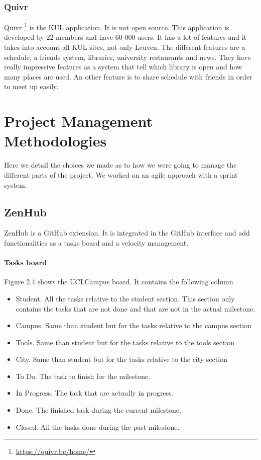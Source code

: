 \documentclass[11pt, a4paper]{report}
\begin{document}
\subsubsection{Quivr}
Quivr \footnote{\url{https://quivr.be/home/}} is the KUL application. It is not open source. This application is developed by 22 members and have 60 000 users. It has a lot of features and it takes into account all KUL sites, not only Leuven. The different features are a schedule, a friends system, libraries, university restaurants and news. They have really impressive features as a system that tell which library is open and how many places are used. An other feature is to share schedule with friends in order to meet up easily. 


\section{Project Management Methodologies}

Here we detail the choices we made as to how we were going to manage the different parts of the project. We worked on an agile approach with a sprint system. 


\subsection{ZenHub}
ZenHub is a GitHub extension. It is integrated in the GitHub interface and add functionalities as a tasks board and a velocity management.  

\paragraph{Tasks board}
Figure 2.4 shows the UCLCampus board. It contains the following column
\begin{itemize}
\item Student. All the tasks relative to the student section. This section only contains the tasks that are not done and that are not in the actual milestone.
\item Campus. Same than student but for the tasks relative to the campus section
\item Tools. Same than student but for the tasks relative to the tools section
\item City. Same than student but for the tasks relative to the city section
\item To Do. The task to finish for the milestone.
\item In Progress. The task that are actually in progress.
\item Done. The finished task during the current milestone.
\item Closed. All the tasks done during the past milestone.
\end{itemize}
\end{document}
